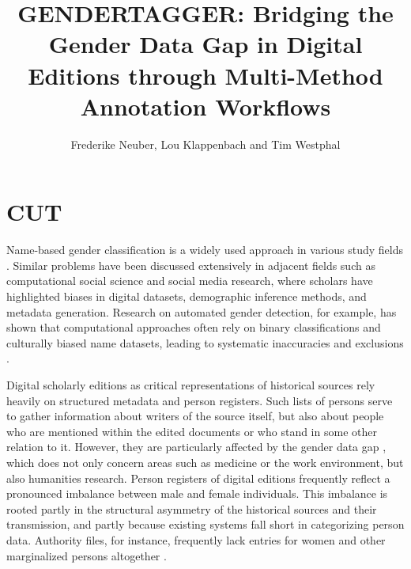 \documentclass{eceasst}
\title{%
GENDERTAGGER: Bridging the Gender Data Gap in Digital Editions through Multi-Method Annotation Workflows}
\author{%
Frederike Neuber\authorOrcid{ 0000-0001-8279-9298}\autref{1},
Lou Klappenbach\authorOrcid{0000-0001-6587-3353}\autref{2} and
Tim Westphal\authorOrcid{0009-0000-8580-4558}\autref{3}}
\institute{%
\autlabel{1} \email{neuber@bbaw.de}\\
\autlabel{2} \email{klappenbach@bbaw.de}\\
\autlabel{3} \email{westphal@bbaw.de}\\
TELOTA, Berlin-Brandenburg Academy of Sciences and Humanities}
\begin{document}
\maketitle


\section{CUT}



Name-based gender classification is a widely used approach in various study fields \cite{buskirk_open-source_2023}. Similar problems have been discussed extensively in adjacent fields such as computational social science and social media research, where scholars have highlighted biases in digital datasets, demographic inference methods, and metadata generation. Research on automated gender detection, for example, has shown that computational approaches often rely on binary classifications and culturally biased name datasets, leading to systematic inaccuracies and exclusions \cite{Karimi Inferring Gender from Names on the Web:
A Comparative Evaluation of Gender Detection Methods}.

Digital scholarly editions as critical representations of historical sources \cite{sahle_digitale_2013} rely heavily on structured metadata and person registers. Such lists of persons serve to gather information about writers of the source itself, but also about people who are mentioned within the edited documents or who stand in some other relation to it. However, they are particularly affected by the gender data gap \cite{criado-perez_invisible_2020}, which does not only concern areas such as medicine or the work environment, but also humanities research. Person registers of digital editions frequently reflect a pronounced imbalance between male and female individuals. This imbalance is rooted partly in the structural asymmetry of the historical sources and their transmission, and partly because existing systems fall short in categorizing person data. Authority files, for instance, frequently lack entries for women and other marginalized persons altogether \cite{aleksander_gendern_2025}.
\end{document}
